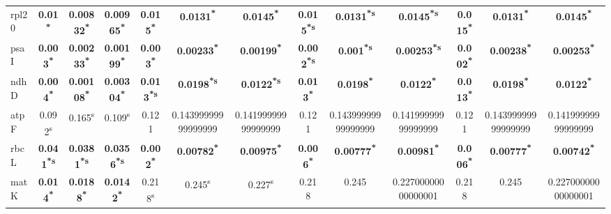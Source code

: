 \documentclass[a4paper]{article}
\begin{document}
\begin{longtable}{l|c|c|c|c|c|c|c|c|c|c|c|c}
rpl20&\textbf{0.01\textsuperscript{*}}&\textbf{0.00832\textsuperscript{*}}&\textbf{0.00965\textsuperscript{*}}&\textbf{0.015\textsuperscript{*}}&\textbf{0.0131\textsuperscript{*}}&\textbf{0.0145\textsuperscript{*}}&\textbf{0.015\textsuperscript{*}\textsuperscript{s}}&\textbf{0.0131\textsuperscript{*}\textsuperscript{s}}&\textbf{0.0145\textsuperscript{*}\textsuperscript{s}}&\textbf{0.015\textsuperscript{*}}&\textbf{0.0131\textsuperscript{*}}&\textbf{0.0145\textsuperscript{*}}\\
psaI&\textbf{0.003\textsuperscript{*}}&\textbf{0.00233\textsuperscript{*}}&\textbf{0.00199\textsuperscript{*}}&\textbf{0.003\textsuperscript{*}}&\textbf{0.00233\textsuperscript{*}}&\textbf{0.00199\textsuperscript{*}}&\textbf{0.002\textsuperscript{*}\textsuperscript{s}}&\textbf{0.001\textsuperscript{*}\textsuperscript{s}}&\textbf{0.00253\textsuperscript{*}\textsuperscript{s}}&\textbf{0.002\textsuperscript{*}}&\textbf{0.00238\textsuperscript{*}}&\textbf{0.00253\textsuperscript{*}}\\
ndhD&\textbf{0.004\textsuperscript{*}}&\textbf{0.00108\textsuperscript{*}}&\textbf{0.00304\textsuperscript{*}}&\textbf{0.013\textsuperscript{*}\textsuperscript{s}}&\textbf{0.0198\textsuperscript{*}\textsuperscript{s}}&\textbf{0.0122\textsuperscript{*}\textsuperscript{s}}&\textbf{0.013\textsuperscript{*}}&\textbf{0.0198\textsuperscript{*}}&\textbf{0.0122\textsuperscript{*}}&\textbf{0.013\textsuperscript{*}}&\textbf{0.0198\textsuperscript{*}}&\textbf{0.0122\textsuperscript{*}}\\
atpF&0.092\textsuperscript{s}&0.165\textsuperscript{s}&0.109\textsuperscript{s}&0.121&0.14399999999999999&0.14199999999999999&0.121&0.14399999999999999&0.14199999999999999&0.121&0.14399999999999999&0.14199999999999999\\
rbcL&\textbf{0.041\textsuperscript{*}\textsuperscript{s}}&\textbf{0.0381\textsuperscript{*}\textsuperscript{s}}&\textbf{0.0356\textsuperscript{*}\textsuperscript{s}}&\textbf{0.002\textsuperscript{*}}&\textbf{0.00782\textsuperscript{*}}&\textbf{0.00975\textsuperscript{*}}&\textbf{0.006\textsuperscript{*}}&\textbf{0.00777\textsuperscript{*}}&\textbf{0.00981\textsuperscript{*}}&\textbf{0.006\textsuperscript{*}}&\textbf{0.00777\textsuperscript{*}}&\textbf{0.00742\textsuperscript{*}}\\
matK&\textbf{0.014\textsuperscript{*}}&\textbf{0.0188\textsuperscript{*}}&\textbf{0.0142\textsuperscript{*}}&0.218\textsuperscript{s}&0.245\textsuperscript{s}&0.227\textsuperscript{s}&0.218&0.245&0.22700000000000001&0.218&0.245&0.22700000000000001\\

\end{longtable}
\end{document}
